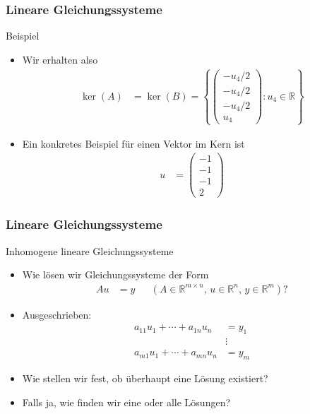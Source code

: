 \documentclass{beamer}
\newcommand\RR{\mathbb R}
\newcommand\cbc[1]{\left\{{#1}\right\}}
\renewcommand{\oe}{\"o}
\newcommand{\ue}{\"u}
\newcommand{\mytitle}{Lineare Gleichungssysteme}
\begin{document}
\begin{frame}\frametitle{\mytitle}
	\begin{block}{Beispiel}
	\begin{itemize}
		\item Wir erhalten also
			\begin{align*}
				\ker(A)&=\ker(B)=\cbc{\begin{pmatrix} -u_4/2\\-u_4/2\\-u_4/2\\u_4 \end{pmatrix}:u_4\in\RR}
			\end{align*}
		\item Ein konkretes Beispiel f\ue r einen Vektor im Kern ist
			\begin{align*}
				u&=\begin{pmatrix} -1\\-1\\-1\\2 \end{pmatrix}
			\end{align*}
	\end{itemize}
	\end{block}
\end{frame}

\begin{frame}\frametitle{\mytitle}
	\begin{block}{Inhomogene lineare Gleichungssysteme}
		\begin{itemize}
			\item Wie l\oe sen wir Gleichungssysteme der Form
				\begin{align*}
					Au&=y&&(A\in\RR^{m\times n},\,u\in\RR^n,\,y\in\RR^m)?
				\end{align*}
			\item Ausgeschrieben:
				\begin{align*}
					a_{11}u_1+\cdots+a_{1n}u_n&=y_1\\
											  &\vdots\\
					a_{m1}u_1+\cdots+a_{mn}u_n&=y_m
				\end{align*}
			\item Wie stellen wir fest, ob \ue berhaupt eine L\oe sung existiert?
			\item Falls ja, wie finden wir eine oder alle L\oe sungen?
		\end{itemize}
	\end{block}
\end{frame}
\end{document}
